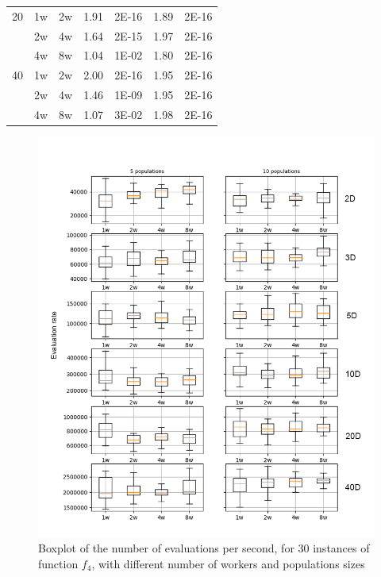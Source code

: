 \documentclass[review]{elsarticle}
\begin{document}
\begin{table}[h!tbp]
\begin{tabular}{lllllll}
    20        & 1w            & 2w            & 1.91            & 2E-16           & 1.89             & 2E-16           \\
              & 2w            & 4w            & 1.64            & 2E-15           & 1.97             & 2E-16           \\
              & 4w            & 8w            & 1.04            & 1E-02           & 1.80             & 2E-16           \\
    40        & 1w            & 2w            & 2.00            & 2E-16           & 1.95             & 2E-16           \\
              & 2w            & 4w            & 1.46            & 1E-09           & 1.95             & 2E-16           \\
              & 4w            & 8w            & 1.07            & 3E-02           & 1.98             & 2E-16          
    \end{tabular}
    \end{table}
%
%
\begin{figure}[h!tbp]
    \centering
    \includegraphics[width=\textwidth]{evalrate}
    \caption{Boxplot of the number of evaluations per second, for 30 instances of function $f_4$, with different number of workers and populations sizes }
    \label{fig:spworker:ratio}
\end{figure}
\end{document}
